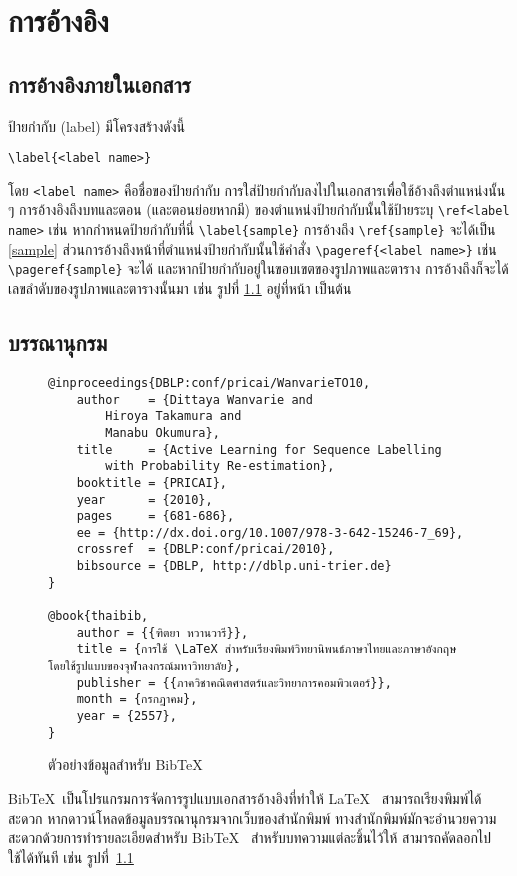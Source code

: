 \chapter{การอ้างอิง}
\section{การอ้างอิงภายในเอกสาร}
ป้ายกำกับ (label) มีโครงสร้างดังนี้
\begin{lstlisting}[numbers=none]
\label{<label name>}
\end{lstlisting}
โดย \lstinline|<label name>| คือชื่อของป้ายกำกับ การใส่ป้ายกำกับลงไปในเอกสารเพื่อใช้อ้างถึงตำแหน่งนั้น ๆ การอ้างอิงถึงบทและตอน (และตอนย่อยหากมี) ของตำแหน่งป้ายกำกับนั้นใช้ป้ายระบุ \lstinline|\ref<label name>| เช่น หากกำหนดป้ายกำกับที่นี่ \lstinline|\label{sample}| \label{sample} การอ้างถึง \lstinline|\ref{sample}| จะได้เป็น \ref{sample} ส่วนการอ้างถึงหน้าที่ตำแหน่งป้ายกำกับนั้นใช้คำสั่ง \lstinline|\pageref{<label name>}| เช่น \lstinline|\pageref{sample}| จะได้ \pageref{sample} และหากป้ายกำกับอยู่ในขอบเขตของรูปภาพและตาราง การอ้างถึงก็จะได้เลขลำดับของรูปภาพและตารางนั้นมา เช่น รูปที่ \ref{Fig:bibtex} อยู่ที่หน้า \pageref{Fig:bibtex} เป็นต้น

\section{บรรณานุกรม}
\begin{figure}
	\begin{verbatim}
@inproceedings{DBLP:conf/pricai/WanvarieTO10,
	author    = {Dittaya Wanvarie and
		Hiroya Takamura and
		Manabu Okumura},
	title     = {Active Learning for Sequence Labelling
		with Probability Re-estimation},
	booktitle = {PRICAI},
	year      = {2010},
	pages     = {681-686},
	ee = {http://dx.doi.org/10.1007/978-3-642-15246-7_69},
	crossref  = {DBLP:conf/pricai/2010},
	bibsource = {DBLP, http://dblp.uni-trier.de}
}

@book{thaibib,
	author = {{ฑิตยา หวานวารี}},
	title = {การใช้ \LaTeX สําหรับเรียงพิมพ์วิทยานิพนธ์ภาษาไทยและภาษาอังกฤษ โดยใช้รูปแบบของจุฬาลงกรณ์มหาวิทยาลัย},
	publisher = {{ภาควิชาคณิตศาสตร์และวิทยาการคอมพิวเตอร์}},
	month = {กรกฎาคม},
	year = {2557},
}
	\end{verbatim}
	\caption{ตัวอย่างข้อมูลสำหรับ BibTeX}
	\label{Fig:bibtex}
\end{figure}
Bib\TeX~เป็นโปรแกรมการจัดการรูปแบบเอกสารอ้างอิงที่ทำให้ \LaTeX~ สามารถเรียงพิมพ์ได้สะดวก หากดาวน์โหลดข้อมูลบรรณานุกรมจากเว็บของสำนักพิมพ์ ทางสำนักพิมพ์มักจะอำนวยความสะดวกด้วยการทำรายละเอียดสำหรับ Bib\TeX~ สำหรับบทความแต่ละชิ้นไว้ให้ สามารถคัดลอกไปใช้ได้ทันที เช่น รูปที่~\ref{Fig:bibtex}

